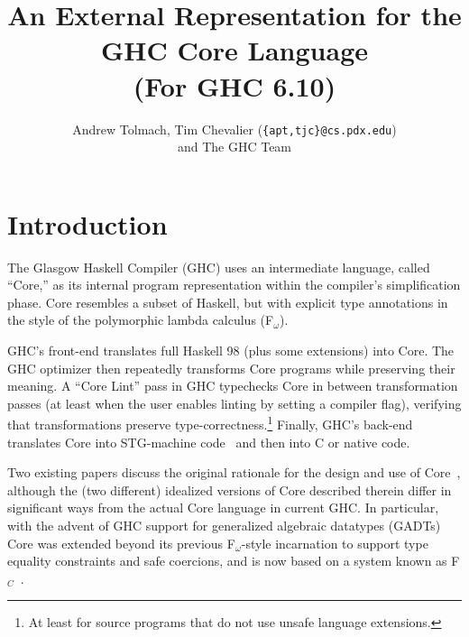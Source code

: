 \documentclass[10pt]{article}
\begin{document}
\title{An External Representation for the GHC Core Language\\ (For GHC 6.10)}
\author{Andrew Tolmach, Tim Chevalier ({\tt \{apt,tjc\}@cs.pdx.edu})\\and The GHC Team}

\maketitle
\makeatactive


\section{Introduction}

The Glasgow Haskell Compiler (GHC) uses an intermediate language, called
``Core,''  as its internal program representation within the compiler's simplification phase.
Core resembles a subset of Haskell, but with explicit type annotations
in the style of the polymorphic lambda calculus (F$_\omega$).

GHC's front-end translates full Haskell 98 (plus some extensions) into Core. The GHC optimizer then repeatedly transforms Core programs while preserving their meaning. A ``Core Lint'' pass in GHC typechecks Core in between transformation passes (at least when the user enables linting by setting a compiler flag), verifying that transformations preserve type-correctness.\footnote{At least for source programs that do not use unsafe language extensions.} Finally, GHC's back-end translates Core into STG-machine code~\citep{stg-machine} and then into
C or native code. 

Two existing papers discuss the original rationale for the design and use of Core~\citep{ghc-inliner,comp-by-trans-scp}, although the (two different)
idealized versions of Core described therein differ in significant ways from the actual Core language in current GHC. In particular, with the advent of GHC support for generalized algebraic datatypes (GADTs)~\citep{gadts} Core was extended beyond its previous F$_\omega$-style incarnation to support type equality constraints and safe coercions, and is now based on a system known as F$_C$~\citep{system-fc}.
\end{document}
